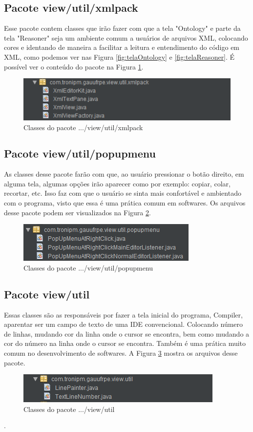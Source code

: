 \documentclass{bcc}
\begin{document}
\subsection{Pacote view/util/xmlpack}
Esse pacote contem classes que irão fazer com que a tela "Ontology" e parte da tela "Reasoner" seja um ambiente comum a usuários de arquivos XML, colocando cores e identando de maneira a facilitar a leitura e entendimento do código em XML, como podemos ver nas Figura \ref{fig:telaOntology} e \ref{fig:telaReasoner}. É possível ver o conteúdo do pacote na Figura \ref{fig:pacoteXmlpack}.
\begin{figure}[H]
\centering
\includegraphics[width=.6\textwidth]{Figuras/pacote_xmlpack.png}
\caption{Classes do pacote .../view/util/xmlpack}
\label{fig:pacoteXmlpack}
\end{figure}

\subsection{Pacote view/util/popupmenu}
As classes desse pacote farão com que, ao usuário pressionar o botão direito, em alguma tela, algumas opções irão aparecer como por exemplo: copiar, colar, recortar, etc. Isso faz com que o usuário se sinta mais confortável e ambientado com o programa, visto que essa é uma prática comum em softwares. Os arquivos desse pacote podem ser visualizados na Figura \ref{fig:pacotePopupmenu}.
\begin{figure}[H]
\centering
\includegraphics[width=.6\textwidth]{Figuras/pacote_popupmenu.png}
\caption{Classes do pacote .../view/util/popupmenu}
\label{fig:pacotePopupmenu}
\end{figure}

\subsection{Pacote view/util}
Essas classes são as responsáveis por fazer a tela inicial do programa, Compiler, aparentar ser um campo de texto de uma IDE convencional. Colocando número de linhas, mudando cor da linha onde o cursor se encontra, bem como mudando a cor do número na linha onde o cursor se encontra. Também é uma prática muito comum no desenvolvimento de softwares. A Figura \ref{fig:pacoteViewUtil} mostra os arquivos desse pacote.
\begin{figure}[H]
\centering
\includegraphics[width=.6\textwidth]{Figuras/pacote_view_util.png}
\caption{Classes do pacote .../view/util}
\label{fig:pacoteViewUtil}
\end{figure}.
\end{document}
